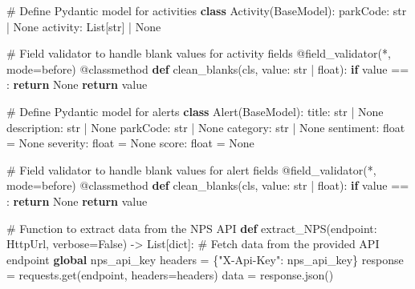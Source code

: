 \documentclass[
  letterpaper,
  DIV=11,
  numbers=noendperiod]{scrartcl}
\newenvironment{Shaded}{\begin{snugshade}}{\end{snugshade}}
\newcommand{\AttributeTok}[1]{\textcolor[rgb]{0.40,0.45,0.13}{#1}}
\newcommand{\BuiltInTok}[1]{\textcolor[rgb]{0.00,0.23,0.31}{#1}}
\newcommand{\CommentTok}[1]{\textcolor[rgb]{0.37,0.37,0.37}{#1}}
\newcommand{\ControlFlowTok}[1]{\textcolor[rgb]{0.00,0.23,0.31}{\textbf{#1}}}
\newcommand{\KeywordTok}[1]{\textcolor[rgb]{0.00,0.23,0.31}{\textbf{#1}}}
\newcommand{\NormalTok}[1]{\textcolor[rgb]{0.00,0.23,0.31}{#1}}
\newcommand{\OperatorTok}[1]{\textcolor[rgb]{0.37,0.37,0.37}{#1}}
\newcommand{\StringTok}[1]{\textcolor[rgb]{0.13,0.47,0.30}{#1}}
\newcommand{\VariableTok}[1]{\textcolor[rgb]{0.07,0.07,0.07}{#1}}
\begin{document}
\begin{Shaded}
\begin{Highlighting}[]
\CommentTok{\# Define Pydantic model for activities}
\KeywordTok{class}\NormalTok{ Activity(BaseModel):}
\NormalTok{    parkCode: }\BuiltInTok{str} \OperatorTok{|} \VariableTok{None}
\NormalTok{    activity: List[}\BuiltInTok{str}\NormalTok{] }\OperatorTok{|} \VariableTok{None}

    \CommentTok{\# Field validator to handle blank values for activity fields}
    \AttributeTok{@field\_validator}\NormalTok{(}\StringTok{\textquotesingle{}*\textquotesingle{}}\NormalTok{, mode}\OperatorTok{=}\StringTok{\textquotesingle{}before\textquotesingle{}}\NormalTok{)}
    \AttributeTok{@classmethod}
    \KeywordTok{def}\NormalTok{ clean\_blanks(cls, value: }\BuiltInTok{str} \OperatorTok{|} \BuiltInTok{float}\NormalTok{):}
        \ControlFlowTok{if}\NormalTok{ value }\OperatorTok{==} \StringTok{\textquotesingle{}\textquotesingle{}}\NormalTok{:}
            \ControlFlowTok{return} \VariableTok{None}
        \ControlFlowTok{return}\NormalTok{ value}

\CommentTok{\# Define Pydantic model for alerts}
\KeywordTok{class}\NormalTok{ Alert(BaseModel):}
\NormalTok{    title: }\BuiltInTok{str} \OperatorTok{|} \VariableTok{None}
\NormalTok{    description: }\BuiltInTok{str} \OperatorTok{|} \VariableTok{None}
\NormalTok{    parkCode: }\BuiltInTok{str} \OperatorTok{|} \VariableTok{None}
\NormalTok{    category: }\BuiltInTok{str} \OperatorTok{|} \VariableTok{None}
\NormalTok{    sentiment: }\BuiltInTok{float} \OperatorTok{=} \VariableTok{None}
\NormalTok{    severity: }\BuiltInTok{float} \OperatorTok{=} \VariableTok{None}
\NormalTok{    score: }\BuiltInTok{float} \OperatorTok{=} \VariableTok{None}

    \CommentTok{\# Field validator to handle blank values for alert fields}
    \AttributeTok{@field\_validator}\NormalTok{(}\StringTok{\textquotesingle{}*\textquotesingle{}}\NormalTok{, mode}\OperatorTok{=}\StringTok{\textquotesingle{}before\textquotesingle{}}\NormalTok{)}
    \AttributeTok{@classmethod}
    \KeywordTok{def}\NormalTok{ clean\_blanks(cls, value: }\BuiltInTok{str} \OperatorTok{|} \BuiltInTok{float}\NormalTok{):}
        \ControlFlowTok{if}\NormalTok{ value }\OperatorTok{==} \StringTok{\textquotesingle{}\textquotesingle{}}\NormalTok{:}
            \ControlFlowTok{return} \VariableTok{None}
        \ControlFlowTok{return}\NormalTok{ value}

\CommentTok{\# Function to extract data from the NPS API}
\KeywordTok{def}\NormalTok{ extract\_NPS(endpoint: HttpUrl, verbose}\OperatorTok{=}\VariableTok{False}\NormalTok{) }\OperatorTok{{-}\textgreater{}}\NormalTok{ List[}\BuiltInTok{dict}\NormalTok{]:}
    \CommentTok{\# Fetch data from the provided API endpoint}
    \KeywordTok{global}\NormalTok{ nps\_api\_key}
\NormalTok{    headers }\OperatorTok{=}\NormalTok{ \{}\StringTok{"X{-}Api{-}Key"}\NormalTok{: nps\_api\_key\}}
\NormalTok{    response }\OperatorTok{=}\NormalTok{ requests.get(endpoint, headers}\OperatorTok{=}\NormalTok{headers)}
\NormalTok{    data }\OperatorTok{=}\NormalTok{ response.json()}


\end{Highlighting}
\end{Shaded}
\end{document}
